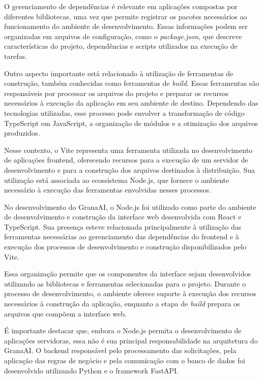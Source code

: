 O gerenciamento de dependências é relevante em aplicações compostas por diferentes bibliotecas, uma vez que permite registrar os pacotes necessários ao funcionamento do ambiente de desenvolvimento. Essas informações podem ser organizadas em arquivos de configuração, como o \textit{package.json}, que descreve características do projeto, dependências e scripts utilizados na execução de tarefas.

Outro aspecto importante está relacionado à utilização de ferramentas de construção, também conhecidas como ferramentas de \textit{build}. Essas ferramentas são responsáveis por processar os arquivos do projeto e preparar os recursos necessários à execução da aplicação em seu ambiente de destino. Dependendo das tecnologias utilizadas, esse processo pode envolver a transformação de código TypeScript em JavaScript, a organização de módulos e a otimização dos arquivos produzidos.

Nesse contexto, o Vite representa uma ferramenta utilizada no desenvolvimento de aplicações frontend, oferecendo recursos para a execução de um servidor de desenvolvimento e para a construção dos arquivos destinados à distribuição. Sua utilização está associada ao ecossistema Node.js, que fornece o ambiente necessário à execução das ferramentas envolvidas nesses processos.

No desenvolvimento do GranaAI, o Node.js foi utilizado como parte do ambiente de desenvolvimento e construção da interface web desenvolvida com React e TypeScript. Sua presença esteve relacionada principalmente à utilização das ferramentas necessárias ao gerenciamento das dependências do frontend e à execução dos processos de desenvolvimento e construção disponibilizados pelo Vite.

Essa organização permite que os componentes da interface sejam desenvolvidos utilizando as bibliotecas e ferramentas selecionadas para o projeto. Durante o processo de desenvolvimento, o ambiente oferece suporte à execução dos recursos necessários à construção da aplicação, enquanto a etapa de \textit{build} prepara os arquivos que compõem a interface web.

É importante destacar que, embora o Node.js permita o desenvolvimento de aplicações servidoras, essa não é sua principal responsabilidade na arquitetura do GranaAI. O backend responsável pelo processamento das solicitações, pela aplicação das regras de negócio e pela comunicação com o banco de dados foi desenvolvido utilizando Python e o framework FastAPI.

